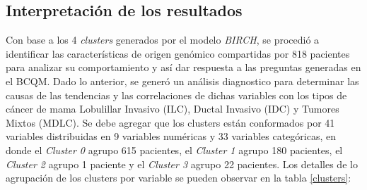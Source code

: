 \subsection{Interpretación de los resultados}
Con base a los 4 \textit{clusters} generados por el modelo \textit{BIRCH}, se procedió a identificar las características de origen genómico compartidas por 818 pacientes para analizar su comportamiento y así dar respuesta a las preguntas generadas en el BCQM. Dado lo anterior, se generó un análisis diagnostico para determinar las causas de las tendencias y las correlaciones de dichas variables con los tipos de cáncer de mama Lobulillar Invasivo (ILC), Ductal Invasivo (IDC) y Tumores Mixtos (MDLC). Se debe agregar que los clusters están conformados por 41 variables distribuidas en 9 variables numéricas y 33 variables categóricas, en donde el \textit{Cluster 0} agrupo 615 pacientes, el \textit{Cluster 1} agrupo 180 pacientes, el \textit{Cluster 2} agrupo 1 paciente y el \textit{Cluster 3} agrupo 22 pacientes. Los detalles de lo agrupación de los clusters por variable se pueden observar en la tabla \ref{clusters}:
